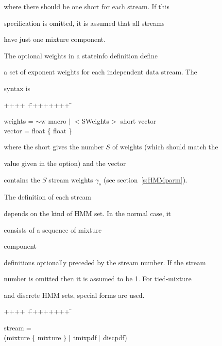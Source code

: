 \noindent


where there should be one {\sf short} for each stream.  If this


specification is omitted, it is assumed that all streams


have just one mixture component.





The optional {\sf weights} in a {\sf stateinfo} definition define


a set of exponent weights for each independent data stream.  The


syntax is


{\sf


\begin{tabbing}


++++ \= ++++++++ \=  \kill


\>   weights = \> $\sim$w macro $|$ $<$SWeights$>$ short vector \\


\>   vector  = \> float \{ float \} 


\end{tabbing}


}


\noindent


where the {\sf short} gives the number $S$ of weights (which should match the


value given in the  option) and the {\sf vector}


contains the $S$ stream weights $\gamma_s$ (see section~\ref{s:HMMparm}).





The definition of each  {\sf stream} 


depends on the kind of HMM set.  In the normal case, it


consists of a sequence of mixture


component


definitions optionally preceded by the stream number.  If the stream


number is omitted then it is assumed to be 1.  For tied-mixture


and discrete HMM sets, special forms are used.


{\sf


\begin{tabbing}


++++ \= ++++++++ \=  \kill


\>   stream =  \\


\>            \> (mixture \{ mixture \} $|$ tmixpdf $|$ discpdf)


\end{tabbing}


}





